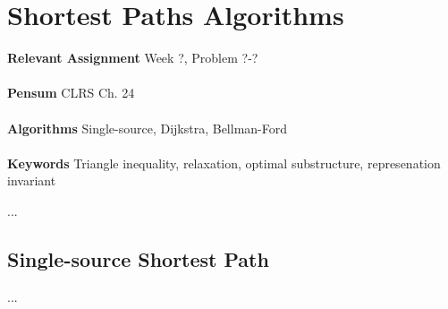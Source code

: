 
\chapter{Shortest Paths Algorithms}
\label{ch:shortestpathsalgorithms}

\textbf{Relevant Assignment} Week ?, Problem ?-?\\\\
\textbf{Pensum} CLRS Ch. 24\\\\
\textbf{Algorithms} Single-source, Dijkstra, Bellman-Ford\\\\
\textbf{Keywords} Triangle inequality, relaxation, optimal substructure,
represenation invariant
\vspace{1in}

\noindent ...

\section{Single-source Shortest Path}
...
